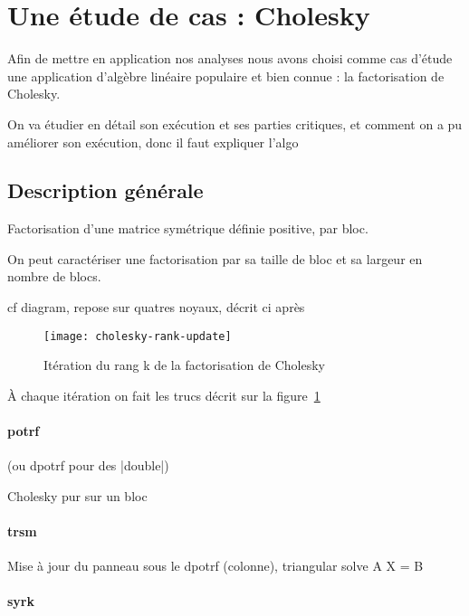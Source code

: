 \section{Une étude de cas : Cholesky}\label{chap:contribs:apps:cholesky}

Afin de mettre en application nos analyses nous avons choisi comme cas d'étude une application d'algèbre linéaire populaire et bien connue : la factorisation de Cholesky.

On va étudier en détail son exécution et ses parties critiques, et comment on a pu améliorer son exécution, donc il faut expliquer l'algo

\subsection{Description générale}

Factorisation d'une matrice symétrique définie positive, par bloc.


On peut caractériser une factorisation par sa taille de bloc et sa largeur en nombre de blocs.

cf diagram, repose sur quatres noyaux, décrit ci après

\begin{figure}[ht]
  \centering
  \texttt{[image: cholesky-rank-update]}
  \caption{Itération du rang k de la factorisation de Cholesky}\label{fig:contribs:apps:cholesky:rank-update}
\end{figure}

À chaque itération on fait les trucs décrit sur la figure~\ref{fig:contribs:apps:cholesky:rank-update}

\paragraph{potrf}

(ou dpotrf pour des |double|)

Cholesky pur sur un bloc

\paragraph{trsm}

Mise à jour du panneau sous le dpotrf (colonne), triangular solve A X = B

\paragraph{syrk}

